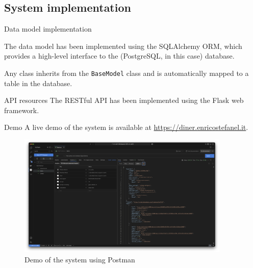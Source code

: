 \subsection[System implementation]{System implementation}

\begin{frame}[allowframebreaks]{Data model implementation}

	The data model has been implemented using the SQLAlchemy ORM, which
	provides a high-level interface to the (PostgreSQL, in this case) database.

	

	Any class inherits from the \texttt{BaseModel} class and is automatically
	mapped to a table in the database.

	\framebreak

	\vspace*{-1\baselineskip}
	

\end{frame}

\begin{frame}{API resources}
	The RESTful API has been implemented using the Flask web framework.

	

	\framebreak

	\vspace*{-1\baselineskip}
	

\end{frame}

\begin{frame}{Demo}
	A live demo of the system is available at \url{https://diner.enricostefanel.it}.

	\begin{figure}
		\centering
		\includegraphics[width=0.9\textwidth,height=0.6\textheight,keepaspectratio]{images/postman.png}
		\vspace*{-1\baselineskip}
		\caption{Demo of the system using Postman}
		\label{fig:demo}
	\end{figure}
\end{frame}


